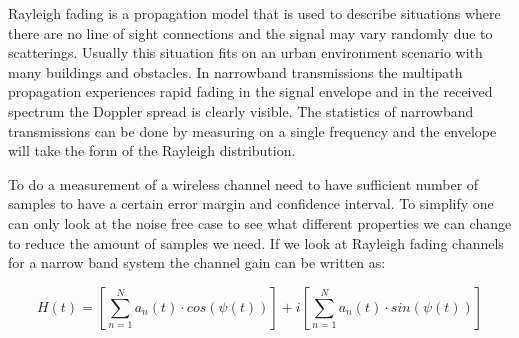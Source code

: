 

Rayleigh fading is a propagation model that is used to describe situations where there are no line of sight connections and the signal may vary randomly due to scatterings. Usually this situation fits on an urban environment scenario with many buildings and obstacles.
In narrowband transmissions  the multipath propagation experiences rapid fading in the signal envelope and in the received spectrum the Doppler spread is clearly visible. The statistics of narrowband transmissions can be done by measuring on a  single frequency and the envelope will take the form of the Rayleigh distribution.

To do a measurement of a wireless channel need to have sufficient number of samples to have a certain error margin and confidence interval. To simplify one can only look at  the noise free case to see what different properties we can change to reduce the amount of samples we need. 
If we look at Rayleigh fading channels for a narrow band system the channel gain can be written as:

\begin{equation}
H(t) = \left [ \sum_{n =1}^{N} a_n(t)\cdot cos(\psi (t))\right ] + i\left [\sum_{n =1}^{N} a_n(t)\cdot sin(\psi (t))  \right ]
\end{equation}

